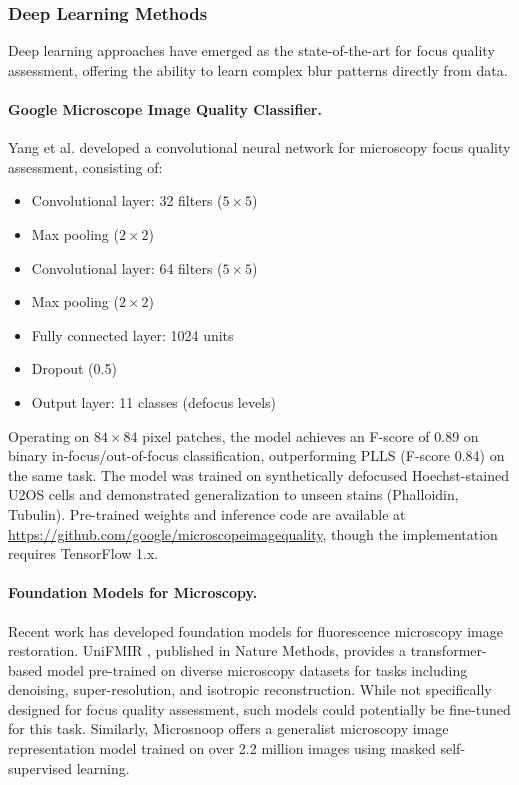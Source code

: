\subsubsection{Deep Learning Methods}

Deep learning approaches have emerged as the state-of-the-art for focus quality assessment, offering the ability to learn complex blur patterns directly from data.

\paragraph{Google Microscope Image Quality Classifier.}
Yang et al. \cite{yang2018assessing} developed a convolutional neural network for microscopy focus quality assessment, consisting of:
\begin{itemize}
    \item Convolutional layer: 32 filters ($5 \times 5$)
    \item Max pooling ($2 \times 2$)
    \item Convolutional layer: 64 filters ($5 \times 5$)
    \item Max pooling ($2 \times 2$)
    \item Fully connected layer: 1024 units
    \item Dropout (0.5)
    \item Output layer: 11 classes (defocus levels)
\end{itemize}
Operating on $84 \times 84$ pixel patches, the model achieves an F-score of 0.89 on binary in-focus/out-of-focus classification, outperforming PLLS (F-score 0.84) on the same task. The model was trained on synthetically defocused Hoechst-stained U2OS cells and demonstrated generalization to unseen stains (Phalloidin, Tubulin). Pre-trained weights and inference code are available at \url{https://github.com/google/microscopeimagequality}, though the implementation requires TensorFlow 1.x.

\paragraph{Foundation Models for Microscopy.}
Recent work has developed foundation models for fluorescence microscopy image restoration. UniFMIR \cite{ma2024unifmir}, published in Nature Methods, provides a transformer-based model pre-trained on diverse microscopy datasets for tasks including denoising, super-resolution, and isotropic reconstruction. While not specifically designed for focus quality assessment, such models could potentially be fine-tuned for this task. Similarly, Microsnoop \cite{microsnoop2023} offers a generalist microscopy image representation model trained on over 2.2 million images using masked self-supervised learning.

